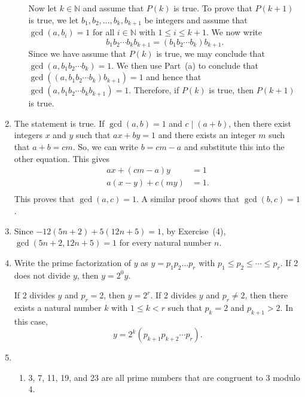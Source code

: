 \begin{enumerate}
\begin{enumerate}
Now let $k \in \mathbb{N}$ and assume that $P \left( k \right)$ is true.  To prove that 
$P \left( k + 1 \right)$ is true, we let $b_1, b_2, \ldots, b_k, b_{k+1}$ be integers and assume that \\
$\gcd \left( {a, b_i } \right) = 1$ for all  $i \in \mathbb{N}$ with  $1 \leq i \leq k+1$.  We now write
\[
b_1 b_2  \cdots b_k b_{k+1} = \left( b_1 b_2  \cdots b_k \right) b_{k+1}.
\] 
Since we have assume that $P \left( k \right)$ is true, we may conclude that 
$\gcd \left( {a, b_1 b_2  \cdots b_k } \right) = 1$.  We then use Part~(a) to conclude that \\
$\gcd \left( \left( {a, b_1 b_2  \cdots b_k } \right)b_{k+1} \right) = 1$ and hence that \\
$\gcd \left( a, b_1 b_2  \cdots b_k b_{k+1} \right) = 1$.  Therefore, if $P \left( k \right)$ is true, then $P \left( k + 1 \right)$ is true.
\end{enumerate}

\item The statement is true.  If   $\gcd \left( {a, b} \right) = 1$  and  
$c \mid \left( {a + b} \right)$, then there exist integers $x$ and $y$ such that 
$ax + by = 1$ and there exists an integer $m$ such that $a + b = cm$.  So, we can write 
$b = cm - a$ and substitute this into the other equation.  This gives
\[
\begin{aligned}
              ax + \left( cm - a \right) y &= 1 \\
a \left( x - y \right) + c \left( my \right) &= 1. \\
\end{aligned}
\]
This proves that $\gcd \left( a, c \right) = 1$.  A similar proof shows that 
$\gcd \left( b, c \right) = 1$.

\item Since $-12 \left( 5n + 2 \right) + 5 \left( 12n + 5 \right) = 1$, by Exercise~(4), 
$\gcd \left( 5n + 2, 12n + 5 \right) = 1$ for every natural number $n$.

\item Write the prime factorization of $y$ as $y = p_1 p_2 \ldots p_r$ with 
$p_1 \leq p_2 \leq \cdots \leq p_r$.  If 2 does not divide $y$, then
$y = 2^0 y$.

If 2 divides $y$ and $p_r = 2$, then $y = 2^r$.  If 2 divides $y$ and $p_r \ne 2$, then there exists a natural number $k$ with $1 \leq k < r$ such that $p_k = 2$ and $p_{k+1}>2$.  In this case,
\[
y = 2^k \left( p_{k+1} p_{k+2} \cdots p_r \right).
\]

\item \begin{enumerate}
\item 3, 7, 11, 19, and 23 are all prime numbers that are congruent to 3 modulo 4.


\end{enumerate}
\end{enumerate}
